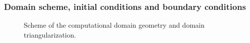 \documentclass[review]{myarticle}
\begin{document}
\subsubsection{Domain scheme, initial conditions and boundary conditions}%
\label{bccond}
 \begin{figure}
\centering
{}
 \caption{Scheme of the computational domain geometry and domain triangularization.}
 \label{valec}
\end{figure}
\end{document}
